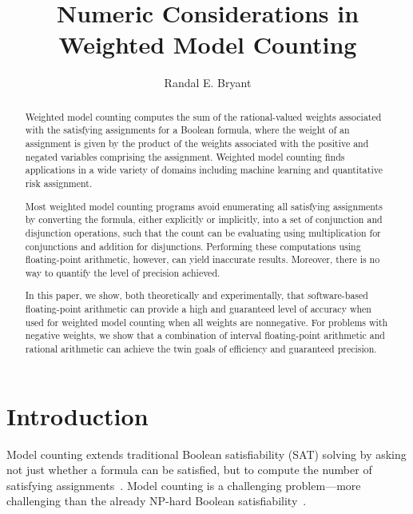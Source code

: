 \documentclass[letterpaper,USenglish,cleveref, autoref, thm-restate]{lipics-v2021}
\title{Numeric Considerations in Weighted Model Counting}
\author{Randal E. Bryant}{Computer Science Department, Carnegie Mellon University, Pittsburgh, PA 15213 USA}{Randy.Bryant@cs.cmu.edu}{https://orcid.org/0000-0001-5024-6613}{}
\begin{document}
\maketitle

\begin{abstract}
 Weighted model counting computes the sum of the rational-valued weights
  associated with the satisfying assignments for a Boolean formula,
  where the weight of an assignment is given by the product of the
  weights associated with the positive and negated variables
  comprising the assignment.  Weighted model counting finds
  applications in a wide variety of domains including machine learning
  and quantitative risk assignment.

  Most weighted model counting programs avoid enumerating all
  satisfying assignments by converting the formula, either explicitly or
  implicitly, into a set of conjunction and disjunction operations,
  such that the count can be evaluating using multiplication for
  conjunctions and addition for disjunctions.  Performing these
  computations using floating-point arithmetic, however, can yield
  inaccurate results.  Moreover, there is no way to quantify the
  level of precision achieved.

  In this paper, we show, both theoretically and experimentally, that
  software-based floating-point arithmetic can provide a high and
  guaranteed level of accuracy when used for weighted model counting
  when all weights are nonnegative.  For problems with negative
  weights, we show that a combination of interval floating-point
  arithmetic and rational arithmetic can achieve the twin goals of
  efficiency and guaranteed precision.
\end{abstract}

\section{Introduction}

Model counting extends traditional Boolean satisfiability (SAT) solving by
asking not just whether a formula can be satisfied, but to compute the
number of satisfying assignments~\cite{gomes:hs:2009}.  Model counting is a challenging
problem---more challenging than the already NP-hard Boolean
satisfiability~\cite{valiant:siam:1979}.
\end{document}
